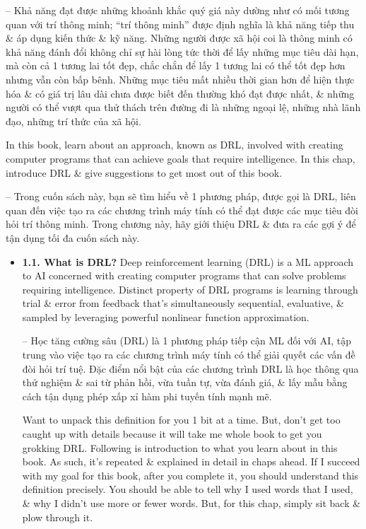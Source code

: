 \documentclass{article}
\begin{document}
\begin{itemize}
    -- Khả năng đạt được những khoảnh khắc quý giá này dường như có mối tương quan với trí thông minh; ``trí thông minh'' được định nghĩa là khả năng tiếp thu \& áp dụng kiến thức \& kỹ năng. Những người được xã hội coi là thông minh có khả năng đánh đổi không chỉ sự hài lòng tức thời để lấy những mục tiêu dài hạn, mà còn cả 1 tương lai tốt đẹp, chắc chắn để lấy 1 tương lai có thể tốt đẹp hơn nhưng vẫn còn bấp bênh. Những mục tiêu mất nhiều thời gian hơn để hiện thực hóa \& có giá trị lâu dài chưa được biết đến thường khó đạt được nhất, \& những người có thể vượt qua thử thách trên đường đi là những ngoại lệ, những nhà lãnh đạo, những trí thức của xã hội.

    In this book, learn about an approach, known as DRL, involved with creating computer programs that can achieve goals that require intelligence. In this chap, introduce DRL \& give suggestions to get most out of this book.

    -- Trong cuốn sách này, bạn sẽ tìm hiểu về 1 phương pháp, được gọi là DRL, liên quan đến việc tạo ra các chương trình máy tính có thể đạt được các mục tiêu đòi hỏi trí thông minh. Trong chương này, hãy giới thiệu DRL \& đưa ra các gợi ý để tận dụng tối đa cuốn sách này.
    \begin{itemize}
        \item {\bf1.1. What is DRL?} Deep reinforcement learning (DRL) is a ML approach to AI concerned with creating computer programs that can solve problems requiring intelligence. Distinct property of DRL programs is learning through trial \& error from feedback that's simultaneously sequential, evaluative, \& sampled by leveraging powerful nonlinear function approximation.

        -- Học tăng cường sâu (DRL) là 1 phương pháp tiếp cận ML đối với AI, tập trung vào việc tạo ra các chương trình máy tính có thể giải quyết các vấn đề đòi hỏi trí tuệ. Đặc điểm nổi bật của các chương trình DRL là học thông qua thử nghiệm \& sai từ phản hồi, vừa tuần tự, vừa đánh giá, \& lấy mẫu bằng cách tận dụng phép xấp xỉ hàm phi tuyến tính mạnh mẽ.

        Want to unpack this definition for you 1 bit at a time. But, don't get too caught up with details because it will take me whole book to get you grokking DRL. Following is introduction to what you learn about in this book. As such, it's repeated \& explained in detail in chaps ahead. If I succeed with my goal for this book, after you complete it, you should understand this definition precisely. You should be able to tell why I used words that I used, \& why I didn't use more or fewer words. But, for this chap, simply sit back \& plow through it.


\end{itemize}
\end{itemize}
\end{document}
